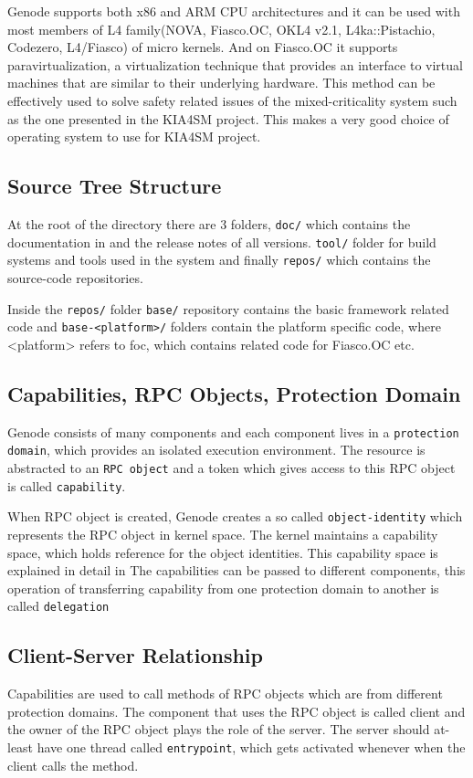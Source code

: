 Genode supports both x86 and ARM CPU architectures and it can be used with most members of L4 family(NOVA, Fiasco.OC, OKL4 v2.1, L4ka::Pistachio, Codezero, L4/Fiasco) of micro kernels. And on Fiasco.OC it supports paravirtualization, a virtualization technique that provides an interface to virtual machines that are similar to their underlying hardware. This method can be effectively used to solve safety related issues of the mixed-criticality system such as the one presented in the KIA4SM project. This makes a very good choice of operating system to use for KIA4SM project.

\subsection{Source Tree Structure}
At the root of the directory there are 3 folders, \texttt{doc/} which contains the documentation in and the release notes of all versions. \texttt{tool/} folder for build systems and tools used in the system and finally \texttt{repos/} which contains the source-code repositories. 

Inside the \texttt{repos/} folder \texttt{base/} repository contains the basic framework related code and \texttt{base-<platform>/} folders contain the platform specific code, where <platform> refers to foc, which contains related code for Fiasco.OC etc.

\subsection{Capabilities, RPC Objects, Protection Domain}\label{Foundations:cap}
Genode consists of many components and each component lives in a \texttt{protection domain}, which provides an isolated execution environment. The resource is abstracted to an \texttt{RPC object} and a token which gives access to this RPC object is called \texttt{capability}.

When RPC object is created, Genode creates a so called \texttt{object-identity} which represents the RPC object in kernel space. The kernel maintains a capability space, which holds reference for the object identities. This capability space is explained in detail in 
The capabilities can be passed to different components, this operation of transferring capability from one protection domain to another is called  \texttt{delegation}

\subsection{Client-Server Relationship}
Capabilities are used to call methods of RPC objects which are from different protection domains. The component that uses the RPC object is called client and the owner of the RPC object plays the role of the server. The server should at-least have one thread called \texttt{entrypoint}, which gets activated whenever when the client calls the method.

